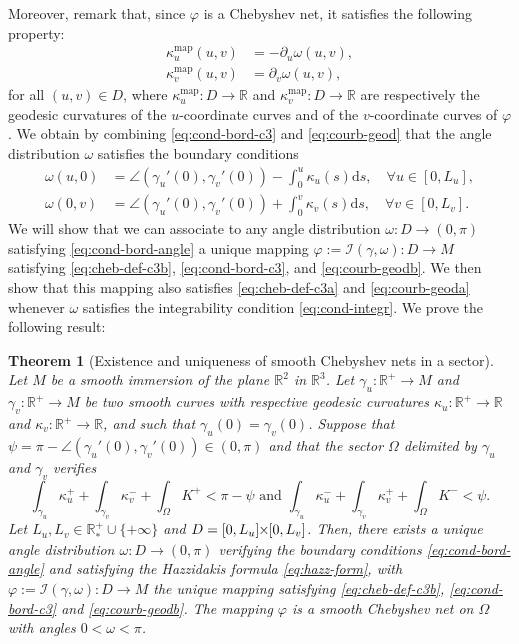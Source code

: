 \documentclass{article}
\newcommand{\I}{\mathcal{I}}
\newcommand{\PLH}{{\mkern-1mu\times\mkern-1mu}}
\newcommand{\Times}{\PLH}
\newcommand{\R}{\mathbb{R}}
\newcommand{\surf}{M}
\newcommand{\ko}{\kappa}
\newcommand{\kop}{\kappa^{\mathrm{map}}}
\newcommand{\ds}{\mathrm{d}s}
\newtheorem{theorem}{Theorem}
\theoremstyle{remark}
\theoremstyle{prpart}
\begin{document}
Moreover, remark that, since $\varphi$ is a Chebyshev net, it satisfies the following property:
\begin{subequations}\label{eq:courb-geod}
\begin{align}\label{eq:courb-geoda}
\kop_u(u,v) &= -\partial_u\omega(u,v), \\\label{eq:courb-geodb}
\kop_v(u,v) &= \partial_v\omega(u,v),
\end{align}
\end{subequations}
for all $(u,v)\in D$, where $\kop_u:D\to\R$ and $\kop_v:D\to\R$ are respectively the geodesic curvatures of the $u$-coordinate curves and of the $v$-coordinate curves of $\varphi$. We obtain by combining \eqref{eq:cond-bord-c3} and \eqref{eq:courb-geod} that the angle distribution $\omega$ satisfies the boundary conditions
\begin{subequations}\label{eq:cond-bord-angle}
\begin{align}
\omega(u, 0) &= \angle(\gamma_u'(0), \gamma_v'(0)) - \int_0^u\ko_u(s)\ds,\quad\forall u\in[0,L_u],\\
\omega(0,v) &= \angle(\gamma_u'(0), \gamma_v'(0)) + \int_0^v\ko_v(s)\ds,\quad\forall v\in[0,L_v].
\end{align}
\end{subequations}
We will show that we can associate to any angle distribution
$\omega:D\to(0,\pi)$ satisfying \eqref{eq:cond-bord-angle} a unique
mapping $\varphi:=\I(\gamma,\omega):D\to\surf$ satisfying
\eqref{eq:cheb-def-c3b}, \eqref{eq:cond-bord-c3}, and
\eqref{eq:courb-geodb}. We then show that this mapping also satisfies
\eqref{eq:cheb-def-c3a} and \eqref{eq:courb-geoda} whenever $\omega$
satisfies the integrability condition \eqref{eq:cond-integr}. We prove the following result:

\begin{theorem}[Existence and uniqueness of smooth Chebyshev nets in a sector]\label{thm2smooth}
Let $\surf$ be a smooth immersion of the plane $\R^2$ in $\R^3$. Let
$\gamma_u:\R^+\to\surf$ and $\gamma_v:\R^+\to\surf$ be two smooth
curves with respective geodesic curvatures $\ko_u:\R^+\to\R$ and
$\ko_v:\R^+\to\R$, and such that $\gamma_u(0) = \gamma_v(0)$. Suppose
that $\psi=\pi-\angle(\gamma_u'(0),\gamma_v'(0))\in(0,\pi)$ and that
the sector $\Omega$ delimited by $\gamma_u$ and $\gamma_v$
verifies \[\int_{\gamma_u}{\ko_u^+} + \int_{\gamma_v}{\ko_v^-} +
\int_{\Omega}{K^+}<\pi-\psi \text{ and } \int_{\gamma_u}{\ko_u^-} +
\int_{\gamma_v}{\ko_v^+} + \int_{\Omega}{K^-}<\psi.\] Let
$L_u,L_v\in\R_\ast^+\cup\{+\infty\}$ and
$D=[0,L_u]\Times[0,L_v]$. Then, there exists a unique angle
distribution $\omega:D\to(0,\pi)$ verifying the boundary conditions
\eqref{eq:cond-bord-angle} and satisfying the Hazzidakis formula
\eqref{eq:hazz-form}, with $\varphi:=\I(\gamma,\omega): D\to\surf$ the
unique mapping satisfying \eqref{eq:cheb-def-c3b},
\eqref{eq:cond-bord-c3} and \eqref{eq:courb-geodb}. The mapping
$\varphi$ is a smooth Chebyshev net on $\Omega$ with angles
$0<\omega<\pi$.
\end{theorem}
\end{document}
